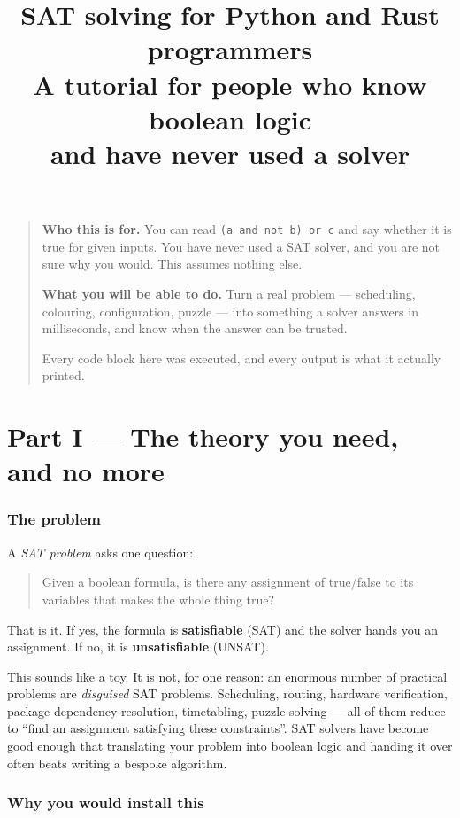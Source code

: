 \documentclass[11pt,a4paper]{article}
\title{\textbf{SAT solving for Python and Rust programmers}\\[4pt]
\large A tutorial for people who know boolean logic\\and have never used a solver}
\author{}
\date{}
\begin{document}
\maketitle

\begin{quote}
\small
\textbf{Who this is for.} You can read \texttt{(a and not b) or c} and say
whether it is true for given inputs. You have never used a SAT solver, and you
are not sure why you would. This assumes nothing else.

\textbf{What you will be able to do.} Turn a real problem --- scheduling,
colouring, configuration, puzzle --- into something a solver answers in
milliseconds, and know when the answer can be trusted.

Every code block here was executed, and every output is what it actually
printed.
\end{quote}

\tableofcontents
\newpage

\part*{Part I --- The theory you need, and no more}

\section{The problem}

A \emph{SAT problem} asks one question:

\begin{quote}
Given a boolean formula, is there any assignment of true/false to its variables
that makes the whole thing true?
\end{quote}

That is it. If yes, the formula is \textbf{satisfiable} (SAT) and the solver
hands you an assignment. If no, it is \textbf{unsatisfiable} (UNSAT).

This sounds like a toy. It is not, for one reason: an enormous number of
practical problems are \emph{disguised} SAT problems. Scheduling, routing,
hardware verification, package dependency resolution, timetabling, puzzle
solving --- all of them reduce to ``find an assignment satisfying these
constraints''. SAT solvers have become good enough that translating your
problem into boolean logic and handing it over often beats writing a bespoke
algorithm.

\section{Why you would install this}
\label{sec:why}
\end{document}
